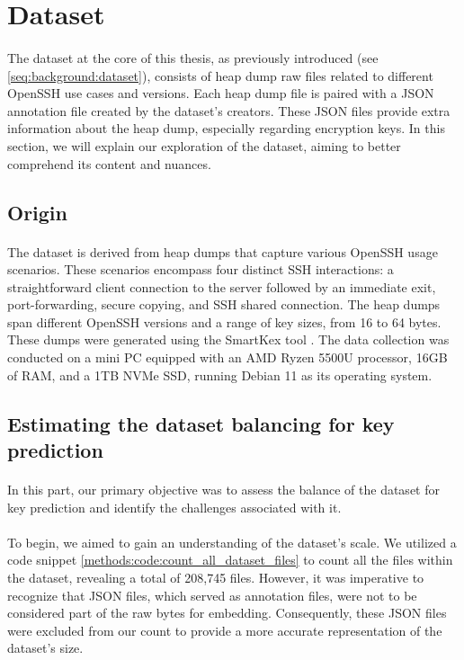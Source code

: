\section{Dataset}
    \paragraph{}The dataset at the core of this thesis, as previously introduced (see \ref{seq:background:dataset}), consists of heap dump raw files related to different OpenSSH use cases and versions. Each heap dump file is paired with a JSON annotation file created by the dataset's creators. These JSON files provide extra information about the heap dump, especially regarding encryption keys. In this section, we will explain our exploration of the dataset, aiming to better comprehend its content and nuances.

    \subsection{Origin}
        \paragraph{}The dataset is derived from heap dumps that capture various OpenSSH usage scenarios. These scenarios encompass four distinct SSH interactions: a straightforward client connection to the server followed by an immediate exit, port-forwarding, secure copying, and SSH shared connection. The heap dumps span different OpenSSH versions and a range of key sizes, from 16 to 64 bytes. These dumps were generated using the SmartKex tool \cite{fellicious_smartkex_2022}. The data collection was conducted on a mini PC equipped with an AMD Ryzen 5500U processor, 16GB of RAM, and a 1TB NVMe SSD, running Debian 11 as its operating system.

    \subsection{Estimating the dataset balancing for key prediction}
        \paragraph{}In this part, our primary objective was to assess the balance of the dataset for key prediction and identify the challenges associated with it.

        \paragraph{}To begin, we aimed to gain an understanding of the dataset's scale. We utilized a code snippet \ref{methods:code:count_all_dataset_files} to count all the files within the dataset, revealing a total of 208,745 files. However, it was imperative to recognize that JSON files, which served as annotation files, were not to be considered part of the raw bytes for embedding. Consequently, these JSON files were excluded from our count to provide a more accurate representation of the dataset's size.

